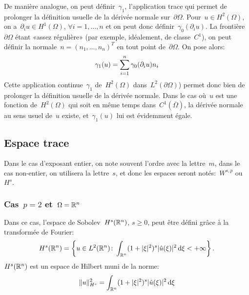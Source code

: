 \medskip
De manière analogue, on peut définir~$\gamma_1$, l'application trace qui permet de prolonger la définition usuelle de la dérivée normale sur~$\partial\Omega$.
Pour~$u\in H^2(\Omega)$, on a~$\partial_iu\in H^1(\Omega)$, $\forall i=1,\ldots,n$ et on peut donc définir~$\gamma_0(\partial_iu)$. La frontière~$\partial\Omega$ étant «assez régulière» (par exemple, idéalement, de classe~$C^1$), on peut définir la normale~$n = (n_1,\ldots,n_n)^T$ en tout point de~$\partial\Omega$.
On pose alors:
\begin{equation}\gamma_1(u) = \displaystyle\sum_{i=1}^n \gamma_0(\partial_iu)n_i\end{equation}
Cette application continue~$\gamma_1$ de~$H^2(\Omega)$ dans~$L^2(\partial\Omega)$) permet donc bien de prolonger la définition usuelle de la dérivée normale.
Dans le cas où~$u$ est une fonction de~$H^2(\Omega)$ qui soit en même temps dans~$C^1(\overline{\Omega})$, la dérivée normale au sens usuel de~$u$ existe, et~$\gamma_1(u)$ lui est évidemment égale.

\medskip
\subsection{Espace trace}

%
Dans le cas d'exposant entier, on note souvent l'ordre avec la lettre~$m$, dans le cas non-entier, on utilisera la lettre~$s$, et donc les espaces seront notés:~$W^{s,p}$ ou~$H^s$.

\medskip
\subsubsection{Cas~$p=2$ et~$\Omega=\mathbb R^{n}$}

Dans ce cas, l'espace de Sobolev~$H^{s}(\mathbb R^n)$, $s\geqslant 0$, peut être défini grâce à la transformée de Fourier:
\begin{equation}
H^{s} (\mathbb R^n) = \left\{ u \in L^{2}(\mathbb R^n) \colon \int_{\mathbb R^n} ( 1 + | \xi |^{2} )^{s} | \hat{u} (\xi) |^{2} \, \text{d}\xi < + \infty \right\}.
\end{equation}
$H^{s}(\mathbb R^n)$ est un espace de Hilbert muni de la norme:
\begin{equation}\| u \|_{H^{s}}^{2} = \int_{\mathbb R^n} ( 1 + | \xi |^{2} )^{s} | \hat{u} (\xi) |^{2} \, \text{d}\xi \end{equation}

